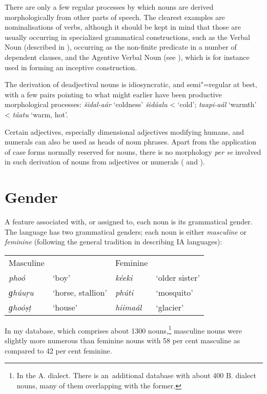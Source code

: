 There are only a few regular processes by which nouns are derived morphologically from other parts of speech. The clearest examples are nominalisations of verbs, although it should be kept in mind that those are usually occurring in specialized grammatical constructions, such as the Verbal Noun (described in ), occurring as the non-finite predicate in a number of dependent clauses, and the Agentive Verbal Noun (see ), which is for instance used in forming an inceptive construction.


The derivation of deadjectival nouns is idiosyncratic, and semi"=regular at best, with a few pairs pointing to what might earlier have been productive morphological processes: \textit{šidal-aár} `coldness' \textit{šidáalu} < `cold'; \textit{taapi-aál} `warmth' < \textit{táatu} `warm, hot'.     


Certain adjectives, especially dimensional adjectives modifying humans, and numerals can also be used as heads of noun phrases. Apart from the application of case forms normally reserved for nouns, there is no morphology \textit{per se} involved in such derivation of nouns from adjectives or numerals ( and ). 


\section{Gender}
\label{sec:4-3}

A feature associated with, or assigned to, each noun is its grammatical gender. The language has two grammatical genders; each noun is either \textit{masculine} or \textit{feminine} (following the general tradition in describing IA languages): 


\begin{table}[H]
\begin{tabularx}{\textwidth}{ Q Q Q Q }
Masculine &
&
Feminine &
\\
\textit{phoó} &
`boy' &
\textit{kéeki} &
`older sister'\\
\textit{ɡhúuṛu} &
`horse, stallion' &
\textit{phúti} &
`mosquito'\\
\textit{ɡhoóṣṭ} &
`house' &
\textit{hiimaál} &
`glacier'\\
\end{tabularx}
\end{table}

In my database, which comprises about 1300 nouns,\footnote{In the A. dialect. There is an~additional database with about 400 B. dialect nouns, many of them overlapping with the former.} masculine nouns were slightly more numerous than feminine nouns with 58 per cent masculine as compared to 42 per cent feminine.


